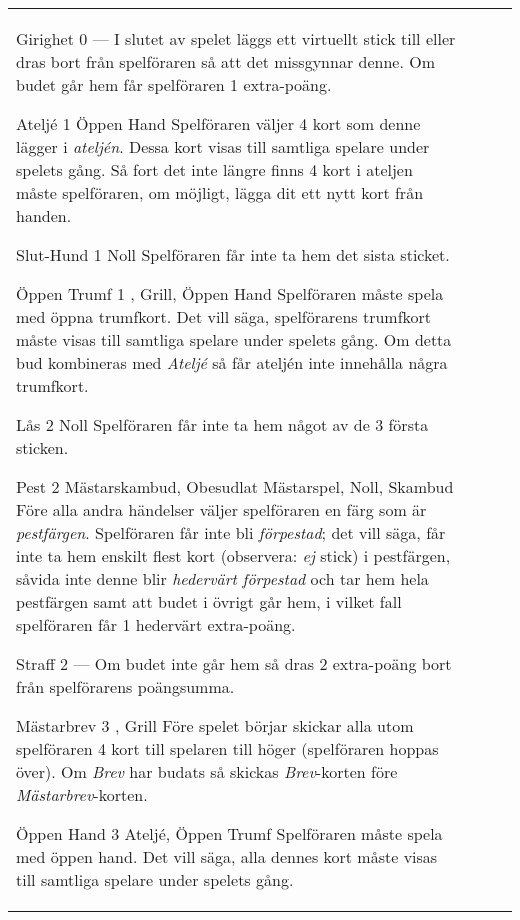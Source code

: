 \begin{table}
\begin{center}
\begin{tabularx}{\textwidth}{
			l
			S[table-number-alignment=center, table-figures-decimal=0]
			p{3cm}
			|X
		}
			\specialBidItem%
			{Girighet}
			{0}
			{---}
			{%
				I slutet av spelet läggs ett virtuellt stick till eller dras bort från spelföraren så att det missgynnar denne. Om budet går hem får spelföraren 1 extra-poäng.
			}

			\specialBidItem%
			{Ateljé}
			{1}
			{Öppen Hand}
			{%
				Spelföraren väljer 4 kort som denne lägger i \emph{ateljén}. Dessa kort visas till samtliga spelare under spelets gång. Så fort det inte längre finns 4 kort i ateljen måste spelföraren, om möjligt, lägga dit ett nytt kort från handen.
			}

			\specialBidItem%
			{Slut-Hund}
			{1}
			{Noll}
			{%
				Spelföraren får inte ta hem det sista sticket.
			}

			\specialBidItem%
			{Öppen Trumf}
			{1}
			{\nonTrump, Grill, Öppen Hand}
			{%
				Spelföraren måste spela med öppna trumfkort. Det vill säga, spelförarens trumfkort måste visas till samtliga spelare under spelets gång. Om detta bud kombineras med \emph{Ateljé} så får ateljén inte innehålla några trumfkort.
			}

			\specialBidItem%
			{Lås}
			{2}
			{Noll}
			{%
				Spelföraren får inte ta hem något av de 3 första sticken.
			}

			\specialBidItem%
			{Pest}
			{2}
			{Mästarskambud, Obesudlat Mästarspel, Noll, Skambud}
			{%
				Före alla andra händelser väljer spelföraren en färg som är \emph{pestfärgen}. Spelföraren får inte bli \emph{förpestad}; det vill säga, får inte ta hem enskilt flest kort (observera: \emph{ej} stick) i pestfärgen, såvida inte denne blir \emph{hedervärt förpestad} och tar hem hela pestfärgen samt att budet i övrigt går hem, i vilket fall spelföraren får 1 hedervärt extra-poäng.
			}

			\specialBidItem%
			{Straff}
			{2}
			{---}
			{%
				Om budet inte går hem så dras 2 extra-poäng bort från spelförarens poängsumma.
			}

			\specialBidItem%
			{Mästarbrev}
			{3}
			{\nonTrump, Grill}
			{%
				Före spelet börjar skickar alla utom spelföraren 4 kort till spelaren till höger (spelföraren hoppas över). Om \emph{Brev} har budats så skickas \emph{Brev}-korten före \emph{Mästarbrev}-korten.
			}

			\specialBidItem%
			{Öppen Hand}
			{3}
			{Ateljé, Öppen Trumf}
			{%
				Spelföraren måste spela med öppen hand. Det vill säga, alla dennes kort måste visas till samtliga spelare under spelets gång.
			}
		\end{tabularx}
	\end{center}
\end{table}
